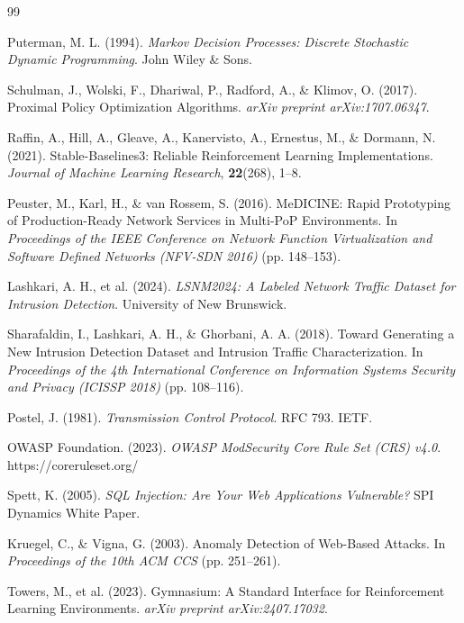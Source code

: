 \documentclass[12pt,a4paper,twoside]{report}
\begin{document}
\begin{thebibliography}{99}

 Puterman, M. L. (1994). \textit{Markov Decision Processes: Discrete Stochastic Dynamic Programming}. John Wiley \& Sons.

 Schulman, J., Wolski, F., Dhariwal, P., Radford, A., \& Klimov, O. (2017). Proximal Policy Optimization Algorithms. \textit{arXiv preprint arXiv:1707.06347}.

 Raffin, A., Hill, A., Gleave, A., Kanervisto, A., Ernestus, M., \& Dormann, N. (2021). Stable-Baselines3: Reliable Reinforcement Learning Implementations. \textit{Journal of Machine Learning Research}, \textbf{22}(268), 1--8.

 Peuster, M., Karl, H., \& van Rossem, S. (2016). MeDICINE: Rapid Prototyping of Production-Ready Network Services in Multi-PoP Environments. In \textit{Proceedings of the IEEE Conference on Network Function Virtualization and Software Defined Networks (NFV-SDN 2016)} (pp. 148--153).

 Lashkari, A. H., et al. (2024). \textit{LSNM2024: A Labeled Network Traffic Dataset for Intrusion Detection}. University of New Brunswick.

 Sharafaldin, I., Lashkari, A. H., \& Ghorbani, A. A. (2018). Toward Generating a New Intrusion Detection Dataset and Intrusion Traffic Characterization. In \textit{Proceedings of the 4th International Conference on Information Systems Security and Privacy (ICISSP 2018)} (pp. 108--116).

 Postel, J. (1981). \textit{Transmission Control Protocol}. RFC 793. IETF.

 OWASP Foundation. (2023). \textit{OWASP ModSecurity Core Rule Set (CRS) v4.0}. https://coreruleset.org/

 Spett, K. (2005). \textit{SQL Injection: Are Your Web Applications Vulnerable?} SPI Dynamics White Paper.

 Kruegel, C., \& Vigna, G. (2003). Anomaly Detection of Web-Based Attacks. In \textit{Proceedings of the 10th ACM CCS} (pp. 251--261).

 Towers, M., et al. (2023). Gymnasium: A Standard Interface for Reinforcement Learning Environments. \textit{arXiv preprint arXiv:2407.17032}.


\end{thebibliography}
\end{document}
